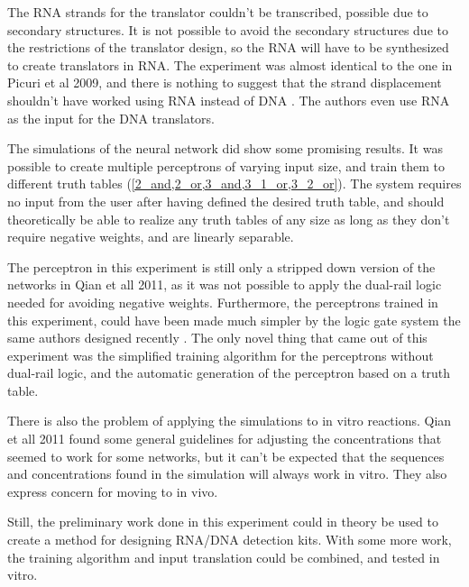 
The RNA strands for the translator couldn't be transcribed, possible due to secondary structures. It is not possible to avoid the secondary structures due to the restrictions of the translator design, so the RNA will have to be synthesized to create translators in RNA. The experiment was almost identical to the one in Picuri et al 2009, and there is nothing to suggest that the strand displacement shouldn't have worked using RNA instead of DNA \cite{Picuri2009}. The authors even use RNA as the input for the DNA translators.

The simulations of the neural network did show some promising results. It was possible to create multiple perceptrons of varying input size, and train them to different truth tables (\cref{2_and,2_or,3_and,3_1_or,3_2_or}). The system requires no input from the user after having defined the desired truth table, and should theoretically be able to realize any truth tables of any size as long as they don't require negative weights, and are linearly separable.

The perceptron in this experiment is still only a stripped down version of the networks in Qian et all 2011, as it was not possible to apply the dual-rail logic needed for avoiding negative weights. Furthermore, the perceptrons trained in this experiment, could have been made much simpler by the logic gate system the same authors designed recently \cite{Thubagere2017}. The only novel thing that came out of this experiment was the simplified training algorithm for the perceptrons without dual-rail logic, and the automatic generation of the perceptron based on a truth table.

There is also the problem of applying the simulations to in vitro reactions. Qian et all 2011 found some general guidelines for adjusting the concentrations that seemed to work for some networks, but it can't be expected that the sequences and concentrations found in the simulation will always work in vitro. They also express concern for moving to in vivo.

Still, the preliminary work done in this experiment could in theory be used to create a method for designing RNA/DNA detection kits. With some more work, the training algorithm and input translation could be combined, and tested in vitro.

